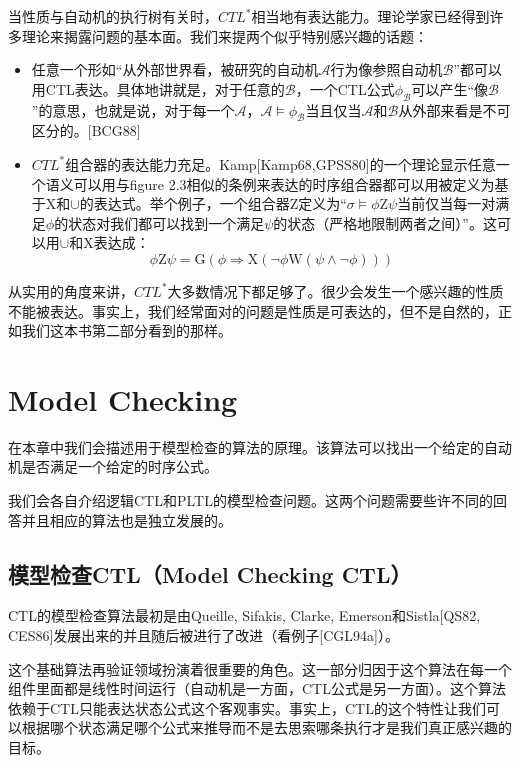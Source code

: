 \documentclass{book}
\begin{document}
    当性质与自动机的执行树有关时，$CTL^*$相当地有表达能力。理论学家已经得到许多理论来揭露问题的基本面。我们来提两个似乎特别感兴趣的话题：
    \begin{itemize}
      \item 任意一个形如“从外部世界看，被研究的自动机$\mathcal{A}$行为像参照自动机$\mathcal{B}$”都可以用CTL表达。具体地讲就是，对于任意的$\mathcal{B}$，一个CTL公式$\phi_{\mathcal{B}}$可以产生“像$\mathcal{B}$”的意思，也就是说，对于每一个$\mathcal{A}$，$\mathcal{A} \models \phi_{\mathcal{B}}$当且仅当$\mathcal{A}$和$\mathcal{B}$从外部来看是不可区分的。[BCG88]
      \item $CTL^*$组合器的表达能力充足。Kamp[Kamp68,GPSS80]的一个理论显示任意一个语义可以用与figure 2.3相似的条例来表达的时序组合器都可以用被定义为基于$\mathrm{X}$和$\cup$的表达式。举个例子，一个组合器$\mathrm{Z}$定义为“$\sigma \models \phi \mathrm{Z} \psi$当前仅当每一对满足$\phi$的状态对我们都可以找到一个满足$\psi$的状态（严格地限制两者之间）”。这可以用$\cup$和$\mathrm{X}$表达成：
          \begin{equation*}
            \phi\mathrm{Z}\psi=\mathrm{G}(\phi \Rightarrow \mathrm{X}(\neg\phi\mathrm{W}(\psi\wedge\neg\phi)))
          \end{equation*}
    \end{itemize}

    从实用的角度来讲，$CTL^*$大多数情况下都足够了。很少会发生一个感兴趣的性质不能被表达。事实上，我们经常面对的问题是性质是可表达的，但不是自然的，正如我们这本书第二部分看到的那样。

    \chapter{Model Checking}

    \quad 在本章中我们会描述用于模型检查的算法的原理。该算法可以找出一个给定的自动机是否满足一个给定的时序公式。

    我们会各自介绍逻辑CTL和PLTL的模型检查问题。这两个问题需要些许不同的回答并且相应的算法也是独立发展的。

    \section{模型检查CTL（Model Checking CTL）}

    \quad CTL的模型检查算法最初是由Queille, Sifakis, Clarke, Emerson和Sistla[QS82, CES86]发展出来的并且随后被进行了改进（看例子[CGL94a]）。

    这个基础算法再验证领域扮演着很重要的角色。这一部分归因于这个算法在每一个组件里面都是线性时间运行（自动机是一方面，CTL公式是另一方面）。这个算法依赖于CTL只能表达状态公式这个客观事实。事实上，CTL的这个特性让我们可以根据哪个状态满足哪个公式来推导而不是去思索哪条执行才是我们真正感兴趣的目标。
\end{document}
